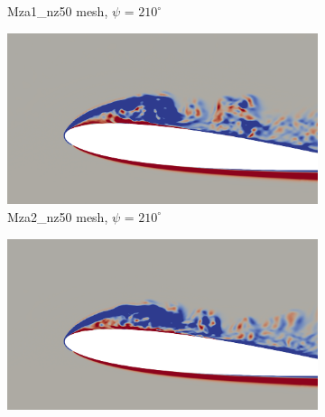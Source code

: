 \begin{figure}[H]
\begin{subfigure}[b]{0.475\textwidth}
		\caption{Mza1\_nz50 mesh, $\psi$ = $210^\circ$}
		\label{fig:Mza1_50_sp_psi210}
	\end{subfigure}
	\begin{subfigure}[b]{0.475\textwidth}
		\centering
		\includegraphics[width=1\textwidth]{figures/zonal_adapt_results/vorticity_plots/v2/Mza2_50/spavg/phase_210.png}
		\caption{Mza2\_nz50 mesh, $\psi$ = $210^\circ$}
		\label{fig:Mza2_50_sp_psi210}
	\end{subfigure}	
	\begin{subfigure}[b]{0.475\textwidth}
		\centering
		\includegraphics[width=1\textwidth]{figures/zonal_adapt_results/vorticity_plots/v2/Mza2_100/spavg/phase_210.png}

\end{subfigure}
\end{figure}

